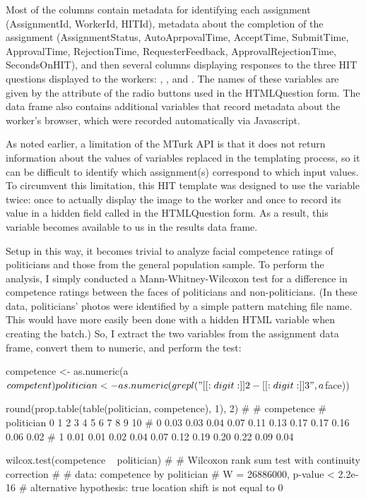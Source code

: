\noindent Most of the columns contain metadata for identifying each
assignment (AssignmentId, WorkerId, HITId), metadata about the
completion of the assignment (AssignmentStatus, AutoAprpovalTime,
AcceptTime, SubmitTime, ApprovalTime, RejectionTime,
RequesterFeedback, ApprovalRejectionTime, SecondsOnHIT), and then
several columns displaying responses to the three HIT questions
displayed to the workers: , , and
. The names of these variables are given by the 
attribute of the radio buttons used in the HTMLQuestion form. The
data frame also contains additional variables that record
metadata about the worker's browser, which were recorded automatically
via Javascript.

As noted earlier, a limitation of the MTurk API is that it does not
return information about the values of variables replaced in the
templating process, so it can be difficult to identify which
assignment(s) correspond to which input values. To circumvent this
limitation, this HIT template was designed to use the
 variable twice: once to actually display the image
to the worker and once to record its value in a hidden field called
 in the HTMLQuestion form. As a result, this variable
becomes available to us in the results data frame.

Setup in this way, it becomes trivial to analyze facial competence
ratings of politicians and those from the general population
sample. To perform the analysis, I simply conducted a
Mann-Whitney-Wilcoxon test for a difference in competence ratings
between the faces of politicians and non-politicians. (In these data,
politicians' photos were identified by a simple pattern matching file
name. This would have more easily been done with a hidden HTML
variable when creating the batch.) So, I extract the two variables
from the assignment data frame, convert them to numeric, and
perform the test:

\begin{example}
competence <- as.numeric(a$competent)
politician <- as.numeric(grepl("[[:digit:]]{2}-[[:digit:]]{3}", a$face))

round(prop.table(table(politician, competence), 1), 2)
#
#           competence
# politician    0    1    2    3    4    5    6    7    8    9   10
#          0 0.03 0.03 0.04 0.07 0.11 0.13 0.17 0.17 0.16 0.06 0.02
#          1 0.01 0.01 0.02 0.04 0.07 0.12 0.19 0.20 0.22 0.09 0.04

wilcox.test(competence ~ politician)
# 
#         Wilcoxon rank sum test with continuity correction
# 
# data:  competence by politician
# W = 26886000, p-value < 2.2e-16
# alternative hypothesis: true location shift is not equal to 0
\end{example}

